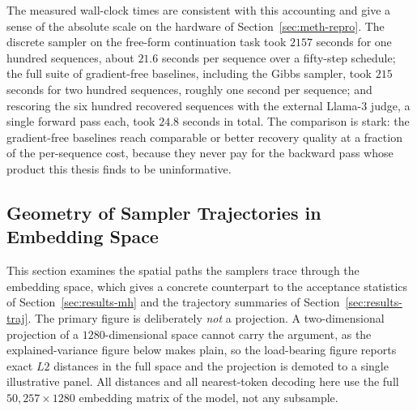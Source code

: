 The measured wall-clock times are consistent with this accounting and give a sense of the absolute scale on the hardware of Section~\ref{sec:meth-repro}. The discrete sampler on the free-form continuation task took $2157$ seconds for one hundred sequences, about $21.6$ seconds per sequence over a fifty-step schedule; the full suite of gradient-free baselines, including the Gibbs sampler, took $215$ seconds for two hundred sequences, roughly one second per sequence; and rescoring the six hundred recovered sequences with the external Llama-3 judge, a single forward pass each, took $24.8$ seconds in total.
The comparison is stark: the gradient-free baselines reach comparable or better recovery quality at a fraction of the per-sequence cost, because they never pay for the backward pass whose product this thesis finds to be uninformative.

\clearpage
\subsection{Geometry of Sampler Trajectories in Embedding Space}
\label{app:trajectory}

This section examines the spatial paths the samplers trace through the embedding space, which gives a concrete counterpart to the acceptance statistics of Section~\ref{sec:results-mh} and the trajectory summaries of Section~\ref{sec:results-traj}.
The primary figure is deliberately \emph{not} a projection. A two-dimensional projection of a $1280$-dimensional space cannot carry the argument, as the explained-variance figure below makes plain, so the load-bearing figure reports exact $L2$ distances in the full space and the projection is demoted to a single illustrative panel. All distances and all nearest-token decoding here use the full $50{,}257\times 1280$ embedding matrix of the model, not any subsample.

